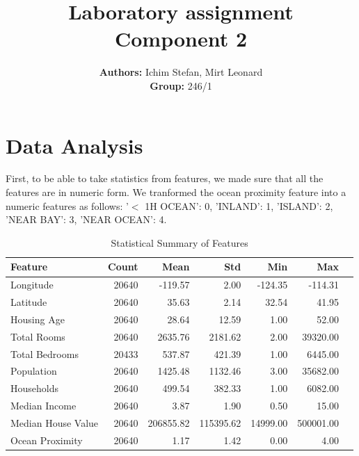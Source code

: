 \documentclass[a4paper, 11pt]{article}
\title{\textbf{Laboratory assignment} \\[1ex] \large \textbf{Component} {2}}
\author{\textbf{Authors:} {Ichim Stefan, Mirt Leonard}\\ \textbf{Group:} {246/1}}
\begin{document}
\maketitle

\section{Data Analysis}
First, to be able to take statistics from features, we made sure that all the features are in numeric form. We tranformed the ocean proximity feature into a numeric features as follows:
'$<$ 1H OCEAN': 0, 
'INLAND': 1, 
'ISLAND': 2, 
'NEAR BAY': 3, 
'NEAR OCEAN': 4.

\begin{table}[h!]
\centering
\caption{Statistical Summary of Features}
\begin{tabular}{lrrrrrr}
\toprule
\textbf{Feature} & \textbf{Count} & \textbf{Mean} & \textbf{Std} & \textbf{Min} & \textbf{Max} \\
\midrule
Longitude         & 20640 & -119.57 & 2.00 & -124.35 & -114.31 \\
Latitude          & 20640 & 35.63   & 2.14 & 32.54   & 41.95   \\
Housing Age       & 20640 & 28.64   & 12.59 & 1.00   & 52.00   \\
Total Rooms       & 20640 & 2635.76 & 2181.62 & 2.00 & 39320.00 \\
Total Bedrooms    & 20433 & 537.87  & 421.39 & 1.00   & 6445.00 \\
Population        & 20640 & 1425.48 & 1132.46 & 3.00  & 35682.00 \\
Households        & 20640 & 499.54  & 382.33 & 1.00   & 6082.00 \\
Median Income     & 20640 & 3.87    & 1.90 & 0.50    & 15.00   \\
Median House Value & 20640 & 206855.82 & 115395.62 & 14999.00 & 500001.00 \\
Ocean Proximity   & 20640 & 1.17    & 1.42 & 0.00    & 4.00    \\
\bottomrule
\end{tabular}
\end{table}
\end{document}
